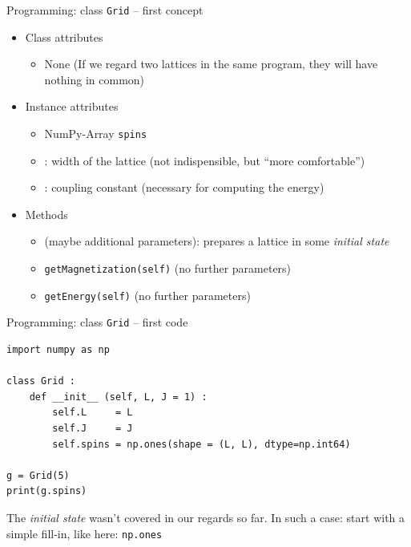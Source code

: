 
\begin{frame}[fragile]{Programming: class \texttt{Grid} -- first concept}
%
\begin{tcolorbox}[title=class \texttt{Grid}]
\begin{itemize}
\item Class attributes
	\begin{itemize}
	\item None (If we regard two lattices in the same program, they will have nothing in common)
	\end{itemize}
\item Instance attributes
	\begin{itemize}
	\item NumPy-Array \texttt{spins}
	\item {}: width of the lattice (not indispensible, but \enquote{more comfortable})
	\item {}: coupling constant (necessary for computing the energy)
	\end{itemize}
\item Methods
	\begin{itemize}
	\item {} (maybe additional parameters): prepares a lattice in some \emph{initial state}
	\item \texttt{getMagnetization(self)} (no further parameters)
	\item \texttt{getEnergy(self)} (no further parameters)
	\end{itemize}
\end{itemize}
\end{tcolorbox}
%
\end{frame}


\begin{frame}[fragile]{Programming: class \texttt{Grid} -- first code}
%
\begin{codebox}
\begin{verbatim}
import numpy as np

class Grid :
    def __init__ (self, L, J = 1) :
        self.L     = L
        self.J     = J
        self.spins = np.ones(shape = (L, L), dtype=np.int64)

g = Grid(5)
print(g.spins)
\end{verbatim}
\end{codebox}
%
\begin{hintbox}
The \emph{initial state} wasn't covered in our regards so far. In such a case: start with a simple fill-in, like here: \texttt{np.ones}
\end{hintbox}
%
\end{frame}

